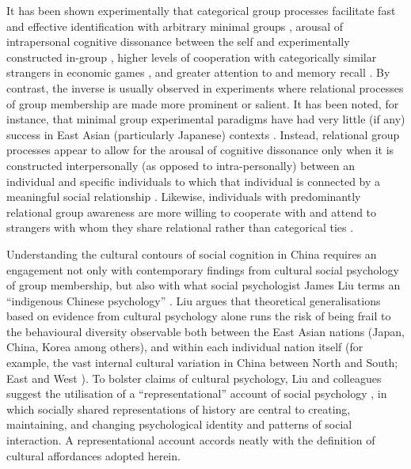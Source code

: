 \begin{CJK}{UTF8}{gbsn}
It has been shown experimentally that categorical group processes facilitate fast and effective identification with arbitrary minimal groups \citep{Diehl1990,VanBavel2014}, arousal of intrapersonal cognitive dissonance between the self and experimentally constructed in-group \citep{Festinger1957,Stone2001}, higher levels of cooperation with categorically similar strangers in economic games \citep{Yuki2005,Yuki2003}, and greater attention to and memory recall \citep{Buchan2006,Ng2016}.  By contrast, the inverse is usually observed in experiments where relational processes of group membership are made more prominent or salient.  It has been noted, for instance, that minimal group experimental paradigms have had very little (if any) success in East Asian (particularly Japanese) contexts \citep[586]{Liu2009}.  Instead, relational group processes appear to allow for the arousal of cognitive dissonance only when it is constructed interpersonally (as opposed to intra-personally) between an individual and specific individuals to which that individual is connected by a meaningful social relationship \citep{Hoshino-Browne2005}.  Likewise, individuals with predominantly relational group awareness are more willing to cooperate with and attend to strangers with whom they share relational rather than categorical ties \citep{Ng2016,Yuki2005}.


Understanding the cultural contours of social cognition in China requires an engagement not only with contemporary findings from cultural social psychology of group membership, but also with what social psychologist James Liu terms an ``indigenous Chinese psychology'' \citep{Triandis1996,Liu2009}.  Liu argues that theoretical generalisations based on evidence from cultural psychology alone runs the risk of being frail to the behavioural diversity observable both between the East Asian nations (Japan, China, Korea among others), and within each individual nation itself (for example, the vast internal cultural variation in China between North and South; East and West \citep[see, for example,][]{Henrich2014}).  To bolster claims of cultural psychology, Liu and colleagues suggest the utilisation of a ``representational'' account of social psychology \citep{Liu2005}, in which socially shared representations of history are central to creating, maintaining, and changing psychological identity and patterns of social interaction.  A representational account accords neatly with the definition of cultural affordances adopted herein.


\end{CJK}
